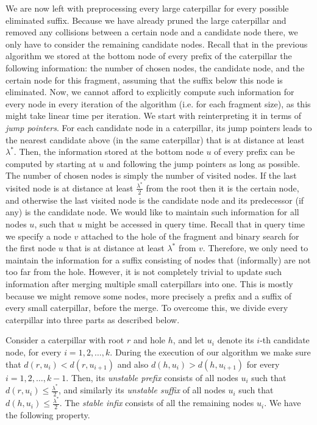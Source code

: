 \documentclass[11pt,a4paper]{article}
\theoremstyle{definition}
\theoremstyle{remark}
\begin{document}
We are now left with preprocessing every large caterpillar for every possible eliminated suffix.
Because we have already pruned the large caterpillar and removed any collisions between a certain
node and a candidate node there, we only have to consider the remaining candidate nodes.
Recall that in the previous algorithm we stored at the bottom node of every prefix of the caterpillar
the following information: the number of chosen nodes, the candidate node, and the certain node for this fragment,
assuming that the suffix below this node is eliminated. Now, we cannot afford to explicitly
compute such information for every node in every iteration of the algorithm (i.e. for each fragment size),
as this might take linear time per iteration. We start with reinterpreting it in terms of
\emph{jump pointers}. For each candidate node in a caterpillar, its jump pointers leads to the nearest
candidate above (in the same caterpillar) that is at distance at least $\lambda^{*}$. Then, the information
stored at the bottom node $u$ of every prefix can be computed by starting at $u$ and following
the jump pointers as long as possible. The number of chosen nodes is simply the number of visited
nodes. If the last visited node is at distance at least $\frac{\lambda^{*}}{2}$ from the root then it is
the certain node, and otherwise the last visited node is the candidate node and its predecessor
(if any) is the candidate node. We would like to maintain such information for all nodes $u$,
such that $u$ might be accessed in query time. Recall that in query time we specify
a node $v$ attached to the hole of the fragment and binary search for the first node $u$ that
is at distance at least $\lambda^{*}$ from $v$. Therefore, we only need to maintain the information
for a suffix consisting of nodes that (informally) are not too far from the hole. However, it is not
completely trivial to update such information after merging multiple small caterpillars into
one. This is mostly because we might remove some nodes, more precisely a prefix and a suffix
of every small caterpillar, before the merge. To overcome this, we divide every caterpillar into
three parts as described below.

Consider a caterpillar with root $r$ and hole $h$, and let $u_{i}$ denote its $i$-th candidate node, for
every $i=1,2,\ldots,k$. During the execution of our algorithm we make sure that $d(r,u_{i}) < d(r,u_{i+1})$
and also $d(h,u_{i}) > d(h,u_{i+1})$ for every $i=1,2,\ldots,k-1$. Then, its \emph{unstable prefix}
consists of all nodes $u_{i}$ such that $d(r,u_{i})\leq \frac{\lambda^{*}}{2}$, and similarly its
\emph{unstable suffix} of all nodes $u_{i}$ such that $d(h,u_{i})\leq \frac{\lambda^{*}}{2}$.
The \emph{stable infix} consists of all the remaining nodes $u_{i}$.  We have the following property.
\end{document}
